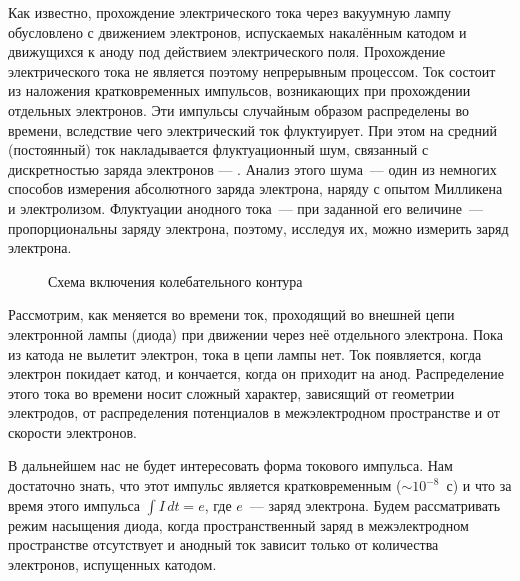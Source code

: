 


Как известно, прохождение электрического тока через вакуумную лампу
обусловлено с движением электронов, испускаемых
накалённым катодом и движущихся к аноду под действием электрического поля.
Прохождение электрического тока не является
поэтому непрерывным процессом. Ток состоит из наложения кратковременных
импульсов, возникающих при прохождении отдельных
электронов. Эти импульсы случайным образом распределены во времени, вследствие
чего электрический ток флуктуирует. При этом на средний (постоянный)
ток накладывается флуктуационный шум, связанный с дискретностью заряда электронов
--- . 
Анализ этого шума~--- один из немногих способов измерения абсолютного заряда электрона, 
наряду с опытом Милликена и электролизом.
Флуктуации анодного тока~--- при заданной его
величине~--- пропорциональны заряду электрона, поэтому, исследуя их, можно
измерить заряд электрона.

\begin{figure}[h!]
    \centering
	\caption{Схема включения колебательного контура}
\end{figure}

Рассмотрим, как меняется во времени ток, проходящий во внешней цепи электронной
лампы (диода) при движении через неё
отдельного электрона. Пока из катода не вылетит электрон, тока в цепи лампы нет.
Ток появляется, когда электрон покидает
катод, и кончается, когда он приходит на анод. Распределение этого тока во
времени носит сложный характер, зависящий от
геометрии электродов, от распределения потенциалов в межэлектродном пространстве
и от скорости электронов.

В дальнейшем нас не будет интересовать форма токового импульса. Нам достаточно
знать, что этот импульс является кратковременным (${\sim}10^{-8}$~с) 
и что за время этого импульса $\int I\,dt=e$, где $e$~--- заряд электрона. 
Будем рассматривать режим насыщения диода, когда пространственный заряд в
межэлектродном пространстве отсутствует и анодный
ток зависит только от количества электронов, испущенных катодом.

